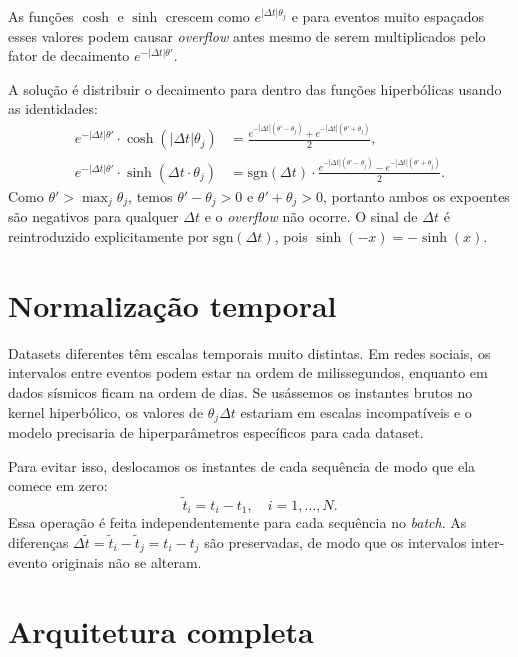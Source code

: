 As funções $\cosh$ e $\sinh$ crescem como $e^{|\Delta t|\theta_j}$ e para eventos muito espaçados esses valores podem causar \textit{overflow} antes mesmo de serem multiplicados pelo fator de decaimento $e^{-|\Delta t|\theta'}$.

A solução é distribuir o decaimento para dentro das funções hiperbólicas usando as identidades:
%
\begin{align}
    e^{-|\Delta t|\theta'} \cdot \cosh(|\Delta t|\theta_j)
    &= \frac{e^{-|\Delta t|(\theta' - \theta_j)} + e^{-|\Delta t|(\theta' + \theta_j)}}{2},
    \label{eq:decay-cosh}\\[4pt]
    e^{-|\Delta t|\theta'} \cdot \sinh(\Delta t \cdot \theta_j)
    &= \mathrm{sgn}(\Delta t) \cdot \frac{e^{-|\Delta t|(\theta' - \theta_j)} - e^{-|\Delta t|(\theta' + \theta_j)}}{2}.
    \label{eq:decay-sinh}
\end{align}
%
Como $\theta' > \max_j \theta_j$, temos $\theta' - \theta_j > 0$ e $\theta' + \theta_j > 0$, portanto ambos os expoentes são negativos para qualquer $\Delta t$ e o \textit{overflow} não ocorre. O sinal de $\Delta t$ é reintroduzido explicitamente por $\mathrm{sgn}(\Delta t)$, pois $\sinh(-x) = -\sinh(x)$.

\section{Normalização temporal}
\label{sec:normalizacao-temporal}

Datasets diferentes têm escalas temporais muito distintas. Em redes sociais, os intervalos entre eventos podem estar na ordem de milissegundos, enquanto em dados sísmicos ficam na ordem de dias. Se usássemos os instantes brutos no kernel hiperbólico, os valores de $\theta_j \Delta t$ estariam em escalas incompatíveis e o modelo precisaria de hiperparâmetros específicos para cada dataset.

Para evitar isso, deslocamos os instantes de cada sequência de modo que ela comece em zero:
%
\begin{equation}
    \tilde{t}_i = t_i - t_1, \quad i = 1, \ldots, N.
    \label{eq:normalizacao-temporal}
\end{equation}
%
Essa operação é feita independentemente para cada sequência no \textit{batch}. As diferenças $\Delta \tilde{t} = \tilde{t}_i - \tilde{t}_j = t_i - t_j$ são preservadas, de modo que os intervalos inter-evento originais não se alteram.

\section{Arquitetura completa}
\label{sec:arquitetura-hothp}


